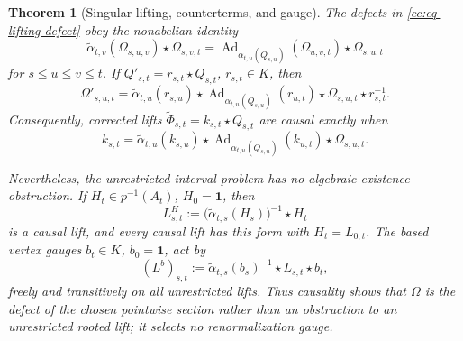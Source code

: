 \documentclass[10pt,reqno]{amsart}
\theoremstyle{plain}
\newtheorem{theorem}{Theorem}[section]
\theoremstyle{definition}
\theoremstyle{remark}
\begin{document}
\begin{theorem}[Singular lifting, counterterms, and gauge]
\label{cc:thm-singular-lifting}
The defects in \eqref{cc:eq-lifting-defect} obey the nonabelian identity
\begin{equation}
 \widetilde\alpha_{t,v}(\Omega_{s,u,v})\star\Omega_{s,v,t}
 =\operatorname{Ad}_{\widetilde\alpha_{t,u}(Q_{s,u})}
      (\Omega_{u,v,t})\star\Omega_{s,u,t}
 \label{cc:eq-nonabelian-two-cocycle}
\end{equation}
for \(s\le u\le v\le t\).  If
\(Q'_{s,t}=r_{s,t}\star Q_{s,t}\), \(r_{s,t}\in K\), then
\begin{equation}
 \Omega'_{s,u,t}
 =\widetilde\alpha_{t,u}(r_{s,u})\star
  \operatorname{Ad}_{\widetilde\alpha_{t,u}(Q_{s,u})}(r_{u,t})
  \star\Omega_{s,u,t}\star r_{s,t}^{-1}.
 \label{cc:eq-defect-gauge-change}
\end{equation}
Consequently, corrected lifts
\(\widetilde\Phi_{s,t}=k_{s,t}\star Q_{s,t}\) are causal exactly when
\begin{equation}
 k_{s,t}=\widetilde\alpha_{t,u}(k_{s,u})\star
 \operatorname{Ad}_{\widetilde\alpha_{t,u}(Q_{s,u})}(k_{u,t})
 \star\Omega_{s,u,t}.
 \label{cc:eq-counterterm-equation}
\end{equation}

Nevertheless, the unrestricted interval problem has no algebraic existence
obstruction.  If \(H_t\in p^{-1}(A_t)\), \(H_0={\mathbf 1}\), then
\begin{equation}
 L^H_{s,t}:=
 \bigl(\widetilde\alpha_{t,s}(H_s)\bigr)^{-1}\star H_t
 \label{cc:eq-rooted-lift}
\end{equation}
is a causal lift, and every causal lift has this form with
\(H_t=L_{0,t}\).  The based vertex gauges \(b_t\in K\), \(b_0={\mathbf 1}\), act by
\begin{equation}
 (L^b)_{s,t}
 :=\widetilde\alpha_{t,s}(b_s)^{-1}\star L_{s,t}\star b_t,
 \label{cc:eq-vertex-gauge}
\end{equation}
freely and transitively on all unrestricted lifts.  Thus causality
shows that \(\Omega\) is the defect of the chosen pointwise section rather
than an obstruction to an unrestricted rooted lift; it selects no
renormalization gauge.
\end{theorem}
\end{document}
